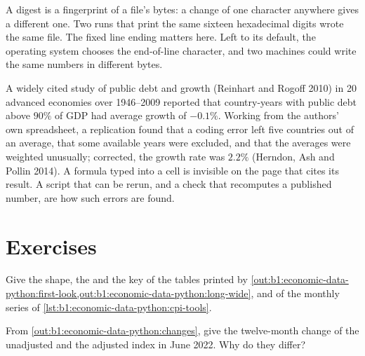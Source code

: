 \label{lst:b1:economic-data-python:write}

\label{out:b1:economic-data-python:write}

A digest is a fingerprint of a file's bytes: a change of one character
anywhere gives a different one. Two runs that print the same sixteen
hexadecimal digits wrote the same file. The fixed line ending matters
here. Left to its default, the operating system chooses the end-of-line
character, and two machines could write the same numbers in different
bytes.

\begin{record}
A widely cited study of public debt and growth (Reinhart and Rogoff 2010)
in 20 advanced economies
over 1946--2009 reported that country-years with public debt above $90\%$ of
GDP had average growth of $-0.1\%$. Working from the authors' own
spreadsheet, a replication found that a coding error left five countries
out of an average, that some available years were excluded, and that the
averages were weighted unusually; corrected, the growth rate was $2.2\%$
(Herndon, Ash and Pollin 2014). %
A formula typed into a cell is invisible on the page that cites its
result. A script that can be rerun, and a check that recomputes a
published number, are how such errors are found.
\end{record}

\section*{Exercises}\label{sec:b1:economic-data-python:exercises}

\begin{exercise}[$\star$]\label{exo:b1:economic-data-python:shapes-ex}
Give the shape, the  and the key of the tables printed
by \cref{out:b1:economic-data-python:first-look,out:b1:economic-data-python:long-wide},
and of the monthly series of \cref{lst:b1:economic-data-python:cpi-tools}.
\end{exercise}

\begin{exercise}[$\star$]\label{exo:b1:economic-data-python:yoy}
From \cref{out:b1:economic-data-python:changes}, give the twelve-month change of the
unadjusted and the adjusted index in June 2022. Why do they differ?
\end{exercise}

